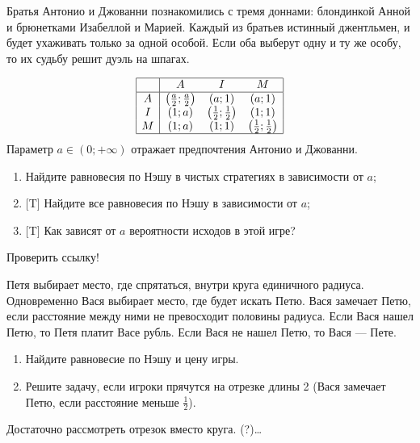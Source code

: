 \begin{problem}
Братья Антонио и Джованни познакомились с тремя доннами: блондинкой Анной и брюнетками Изабеллой и Марией. Каждый из братьев истинный джентльмен, и будет ухаживать только за одной особой. Если оба выберут одну и ту же особу, то их судьбу решит дуэль на шпагах.

\[\begin{array}{|c|ccc|}  \hline {} & {A} & {I} & {M} \\  \hline {A} & {\left(\frac{a}{2} ;\frac{a}{2} \right)} & {\left(a;1\right)} & {\left(a;1\right)} \\ {I} & {\left(1;a\right)} & {\left(\frac{1}{2} ;\frac{1}{2} \right)} & {\left(1;1\right)} \\ {M} & {\left(1;a\right)} & {\left(1;1\right)} & {\left(\frac{1}{2} ;\frac{1}{2} \right)} \\  \hline  \end{array}\]
Параметр  $a\in \left(0;+\infty \right)$  отражает предпочтения Антонио и Джованни.
\begin{enumerate}
\par
\item 	Найдите равновесия по Нэшу в чистых стратегиях в зависимости от  $a$;\par
\item 	$[$T$]$ Найдите все равновесия по Нэшу в зависимости от  $a$; \par
\item 	$[$T$]$ Как зависят от  $a$  вероятности исходов в этой игре?
\end{enumerate}


\begin{sol}

\end{sol}
\end{problem}



\begin{problem}
\begin{source}
 \cite{lones:dtc} {\red Проверить ссылку!}
\end{source}
Петя выбирает место,  где спрятаться, внутри круга единичного радиуса. Одновременно Вася выбирает место, где будет искать Петю. Вася замечает Петю, если расстояние между ними не превосходит половины радиуса. Если Вася нашел Петю, то Петя платит Васе рубль. Если Вася не нашел Петю, то Вася --- Пете. \par
\begin{enumerate}
\item  Найдите равновесие по Нэшу и цену игры. \par
\item Решите задачу, если игроки прячутся на отрезке длины 2 (Вася замечает Петю, если расстояние меньше $\frac{1}{2}$).
\end{enumerate}


\begin{sol}

Достаточно рассмотреть отрезок вместо круга. (?)\ldots
\end{sol}
\end{problem}




